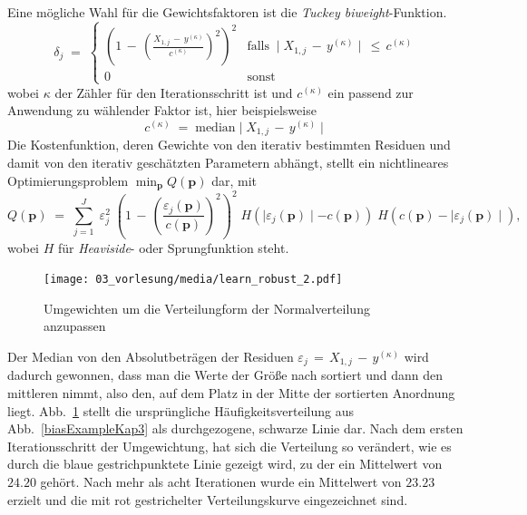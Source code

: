 Eine mögliche Wahl für die Gewichtsfaktoren ist die \textsl{Tuckey biweight}-Funktion.
\begin{equation}
\delta_j \; = \;
\left\{ \begin{array}{cl}
\left( 1 \, - \, \left( \frac{X_{1,j} \, - \, y^{(\kappa)}}{c^{(\kappa)}} \right)^2 \right)^2 &
	\mathrm{falls} \; \mid X_{1,j} \, - \, y^{(\kappa)} \mid \, \leq \, c^{(\kappa)} \\
0 & \mathrm{sonst}
\end{array} \right.
\end{equation}
wobei $\kappa$ der Zähler für den Iterationsschritt ist und $c^{(\kappa)}$ ein passend zur Anwendung zu wählender Faktor ist, hier beispielsweise
\begin{equation}
c^{(\kappa)} \; = \; \mathrm{median} \mid X_{1,j} \, - \, y^{(\kappa)} \mid
\end{equation}
Die Kostenfunktion, deren Gewichte von den iterativ bestimmten Residuen und damit von den
iterativ geschätzten Parametern abhängt, stellt ein nichtlineares Optimierungsproblem
$ \min_{\mathbf{p}} Q(\mathbf{p}) $ dar, mit
\begin{equation}
Q(\mathbf{p}) \; = \; \sum_{j=1}^J \; \varepsilon_j^2 \;
\left( 1 \, - \, \left( \frac{\varepsilon_j(\mathbf{p}) }{c(\mathbf{p})} \right)^2 \right)^2 \;
H(\mid \varepsilon_j(\mathbf{p}) \mid - c(\mathbf{p})) \;
H(c(\mathbf{p}) - \mid \varepsilon_j(\mathbf{p}) \mid ),
\label{robustEstim2}
\end{equation}
wobei $H$ für \textsl{Heaviside}- oder Sprungfunktion steht.

\begin{figure}
\begin{center}
\texttt{[image: 03\_vorlesung/media/learn\_robust\_2.pdf]}
\caption{\label{RobustIter} Umgewichten um die Verteilungform der Normalverteilung anzupassen}
\end{center}
\end{figure}

Der Median von den Absolutbeträgen der Residuen $\varepsilon_j \, = \, X_{1,j} \, - \, y^{(\kappa)}$ wird dadurch gewonnen,
dass man die Werte der Größe nach sortiert und dann den mittleren nimmt, also den, auf dem Platz in der Mitte der sortierten
Anordnung liegt.
Abb.~\ref{RobustIter} stellt die ursprüngliche Häufigkeitsverteilung aus Abb.~\ref{biasExampleKap3} als
durchgezogene, schwarze Linie dar. Nach dem ersten Iterationsschritt der Umgewichtung, hat sich die Verteilung so verändert,
wie es durch die blaue gestrichpunktete Linie gezeigt wird, zu der ein Mittelwert von $24.20$ gehört. Nach mehr als acht Iterationen
wurde ein Mittelwert von $23.23$ erzielt und die mit rot gestrichelter Verteilungskurve eingezeichnet sind.

